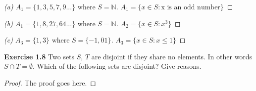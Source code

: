 \documentclass[12pt,oneside]{article}
\newenvironment{exercise}[1]{\vspace{.1in}\noindent\textbf{Exercise #1 \hspace{.05em}}}{}
\newcommand{\N}{\mathbb{N}}
\begin{document}
\begin{proof}[(a) $A_1 = \{1, 3, 5, 7, 9 ...\} \text{ where } S = \N$]

\item$A_1 = \{x \in S: \text{x is an odd number}\}$

\end{proof}

\begin{proof}[(b) $A_1 = \{1, 8, 27, 64 ...\} \text{ where } S = \N$]
\item$A_2 = \{x \in S: x^3\}$
\end{proof}

\begin{proof}[(c) $A_3 = \{1, 3\} \text{ where } S = \{-1, 0 1\}$]
\item$A_3 = \{x\in S: x \leq 1\}$
\end{proof}



\begin{exercise}{1.8}
Two sets $S$, $T$ are disjoint if they share no elements. In other words
$S \cap T= \emptyset$. Which of the following sets are disjoint? Give reasons.
\end{exercise}

\begin{proof}
The proof goes here.
\end{proof}


\end{document}
